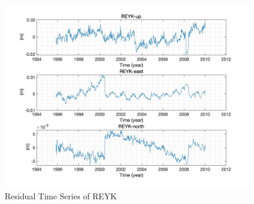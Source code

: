 \documentclass{article}
\begin{document}
\begin{figure}[H]
  \centering
  \includegraphics[width=11cm]{../result/re_figure/fig_REYK/figure2.jpg}
  \caption{Residual Time Series of REYK}
  \label{fig:Res_REYK}
\end{figure}
\end{document}
